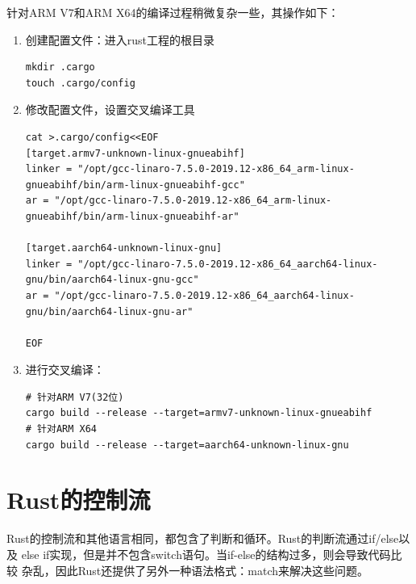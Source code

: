 针对ARM V7和ARM X64的编译过程稍微复杂一些，其操作如下：
\begin{enumerate}
  \item 创建配置文件：进入rust工程的根目录
\begin{mdframed}[topline=false, bottomline=false, leftline=false,
    rightline=false, backgroundcolor=lbcolor]
\begin{verbatim}
mkdir .cargo
touch .cargo/config
\end{verbatim}
\end{mdframed}

  \item 修改配置文件，设置交叉编译工具
\begin{mdframed}[topline=false, bottomline=false, leftline=false,
    rightline=false, backgroundcolor=lbcolor]
\begin{verbatim}
cat >.cargo/config<<EOF
[target.armv7-unknown-linux-gnueabihf]
linker = "/opt/gcc-linaro-7.5.0-2019.12-x86_64_arm-linux-gnueabihf/bin/arm-linux-gnueabihf-gcc"
ar = "/opt/gcc-linaro-7.5.0-2019.12-x86_64_arm-linux-gnueabihf/bin/arm-linux-gnueabihf-ar"

[target.aarch64-unknown-linux-gnu]
linker = "/opt/gcc-linaro-7.5.0-2019.12-x86_64_aarch64-linux-gnu/bin/aarch64-linux-gnu-gcc"
ar = "/opt/gcc-linaro-7.5.0-2019.12-x86_64_aarch64-linux-gnu/bin/aarch64-linux-gnu-ar"

EOF
\end{verbatim}
\end{mdframed}

  \item 进行交叉编译：
\begin{mdframed}[topline=false, bottomline=false, leftline=false,
    rightline=false, backgroundcolor=lbcolor]
\begin{verbatim}
# 针对ARM V7(32位)
cargo build --release --target=armv7-unknown-linux-gnueabihf
# 针对ARM X64
cargo build --release --target=aarch64-unknown-linux-gnu
\end{verbatim}
\end{mdframed}

\end{enumerate}

\section{Rust的控制流}
Rust的控制流和其他语言相同，都包含了判断和循环。Rust的判断流通过if/else以及
else if实现，但是并不包含switch语句。当if-else的结构过多，则会导致代码比较
杂乱，因此Rust还提供了另外一种语法格式：match来解决这些问题。

